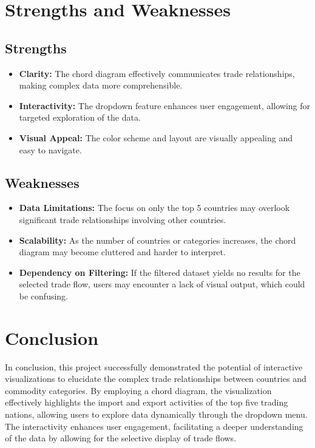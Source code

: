 \documentclass{article}
\begin{document}
\section{Strengths and Weaknesses}

\subsection{Strengths}
\begin{itemize}
    \item \textbf{Clarity:} The chord diagram effectively communicates trade relationships, making complex data more comprehensible.
    \item \textbf{Interactivity:} The dropdown feature enhances user engagement, allowing for targeted exploration of the data.
    \item \textbf{Visual Appeal:} The color scheme and layout are visually appealing and easy to navigate.
\end{itemize}

\subsection{Weaknesses}
\begin{itemize}
    \item \textbf{Data Limitations:} The focus on only the top 5 countries may overlook significant trade relationships involving other countries.
    \item \textbf{Scalability:} As the number of countries or categories increases, the chord diagram may become cluttered and harder to interpret.
    \item \textbf{Dependency on Filtering:} If the filtered dataset yields no results for the selected trade flow, users may encounter a lack of visual output, which could be confusing.
\end{itemize}



\section{Conclusion}

In conclusion, this project successfully demonstrated the potential of interactive visualizations to elucidate the complex trade relationships between countries and commodity categories. By employing a chord diagram, the visualization effectively highlights the import and export activities of the top five trading nations, allowing users to explore data dynamically through the dropdown menu. The interactivity enhances user engagement, facilitating a deeper understanding of the data by allowing for the selective display of trade flows.
\end{document}
